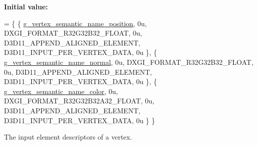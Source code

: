 {\bfseries Initial value\+:}
\begin{DoxyCode}
= \{
        \{ \mbox{\hyperlink{namespacemage_1_1rendering_1_1anonymous__namespace_02vertex_8cpp_03_a6e875b92e4de38b14e8dc404df41a5ad}{g\_vertex\_semantic\_name\_position}}, 0u, DXGI\_FORMAT\_R32G32B32\_FLOAT, 
         0u, D3D11\_APPEND\_ALIGNED\_ELEMENT, D3D11\_INPUT\_PER\_VERTEX\_DATA, 0u \},
        \{ \mbox{\hyperlink{namespacemage_1_1rendering_1_1anonymous__namespace_02vertex_8cpp_03_a1b4bf08af207f8c1681ecf617b094ef3}{g\_vertex\_semantic\_name\_normal}},   0u, DXGI\_FORMAT\_R32G32B32\_FLOAT,   
       0u, D3D11\_APPEND\_ALIGNED\_ELEMENT, D3D11\_INPUT\_PER\_VERTEX\_DATA, 0u \},
        \{ \mbox{\hyperlink{namespacemage_1_1rendering_1_1anonymous__namespace_02vertex_8cpp_03_aae8cd813faec1e62d4e6463db8c99ab5}{g\_vertex\_semantic\_name\_color}},    0u, DXGI\_FORMAT\_R32G32B32A32\_FLOAT, 
      0u, D3D11\_APPEND\_ALIGNED\_ELEMENT, D3D11\_INPUT\_PER\_VERTEX\_DATA, 0u \}
    \}
\end{DoxyCode}
The input element descriptors of a vertex. 